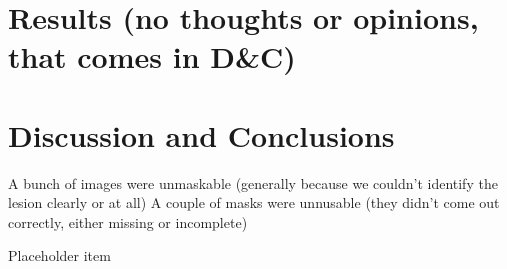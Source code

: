 \documentclass[11pt]{article}
\begin{document}
\section{Results (no thoughts or opinions, that comes in D\&C)}

\section{Discussion and Conclusions}

A bunch of images were unmaskable (generally because we couldn't identify the lesion clearly or at all)
A couple of masks were unnusable (they didn't come out correctly, either missing or incomplete)

%
%

\begin{thebibliography}{}

\item Placeholder item

\end{thebibliography}
\end{document}
